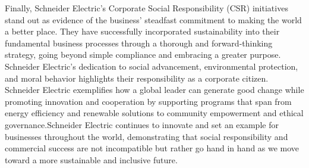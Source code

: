 \vspace{0.5cm}

Finally, Schneider Electric's Corporate Social Responsibility (CSR) initiatives stand out as evidence of the business' steadfast commitment to making the world a better place. They have successfully incorporated sustainability into their fundamental business processes through a thorough and forward-thinking strategy, going beyond simple compliance and embracing a greater purpose. Schneider Electric's dedication to social advancement, environmental protection, and moral behavior highlights their responsibility as a corporate citizen. Schneider Electric exemplifies how a global leader can generate good change while promoting innovation and cooperation by supporting programs that span from energy efficiency and renewable solutions to community empowerment and ethical governance.Schneider Electric continues to innovate and set an example for businesses throughout the world, demonstrating that social responsibility and commercial success are not incompatible but rather go hand in hand as we move toward a more sustainable and inclusive future.







